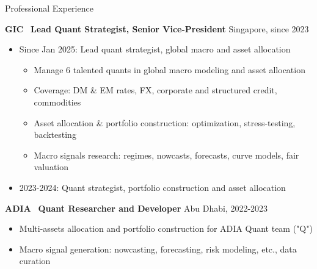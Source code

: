 \documentclass[usegeometry, 10pt, a4paper]{cv} %
\newcommand{\activite}[1]{\textbf{#1}\ }
\begin{document}
\vspace{0.5cm}


\begin{rubriquetableau}[0.95\textwidth]{Professional Experience}\\
\vspace{-0.5cm}

\activite{GIC} \textbf{Lead Quant Strategist, Senior Vice-President} \hfill
Singapore, since 2023 \\ \vspace{-0.4cm}
\begin{itemize}[label={},rightmargin=\dimexpr\linewidth-13cm-\leftmargin\relax]

\item Since Jan 2025: Lead quant strategist, global macro and asset allocation
\begin{itemize}
  \item Manage 6 talented quants in global macro modeling and asset allocation
  \item Coverage: DM \& EM rates, FX, corporate and structured credit, commodities
  \item Asset allocation \& portfolio construction: optimization, stress-testing, backtesting
  \item Macro signals research: regimes, nowcasts, forecasts, curve models, fair valuation
\end{itemize}

\item 2023-2024: Quant strategist, portfolio construction and asset allocation

\end{itemize}
 
\vspace{0.2cm}

\activite{ADIA} \textbf{Quant Researcher and Developer}  \hfill
Abu Dhabi, 2022-2023 \\ \vspace{-0.2cm}
\begin{itemize}[label={},
rightmargin=\dimexpr\linewidth-13cm-\leftmargin\relax]
\item Multi-assets  allocation and  portfolio  construction for ADIA Quant team ("Q")
\item Macro signal generation: nowcasting, forecasting, risk modeling, etc., data curation
 \end{itemize}
 

\end{rubriquetableau}
\end{document}
